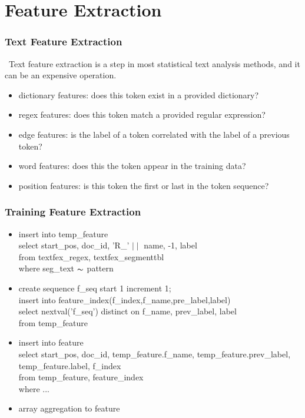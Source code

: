 \documentclass{beamer}
\begin{document}
\section{Feature Extraction}
\begin{frame}
  \frametitle{Text Feature Extraction}
   \ Text feature extraction is a step in most statistical text analysis methods, and it can be an expensive operation. 
     \begin{itemize}
      \item dictionary features: does this token exist in a provided dictionary? 
      \item regex features: does this token match a provided regular expression? 
      \item edge features: is the label of a token correlated with the label of a previous token? 
      \item word features: does this the token appear in the training data? 
      \item position features: is this token the first or last in the token sequence? 
     \end{itemize}
\end{frame}

\begin{frame}
  \frametitle{Training Feature Extraction}
  \begin{itemize}
  \item insert into temp\_feature\\ 
        select start\_pos, doc\_id, 'R\_' $\mid\mid$ name, -1, label\\
        from   textfex\_regex, textfex\_segmenttbl\\
        where  seg\_text $\thicksim$ pattern\\
  \item create sequence f\_seq start 1 increment 1;\\
        insert into feature\_index(f\_index,f\_name,pre\_label,label)\\ 
        select nextval('f\_seq') distinct on f\_name, prev\_label, label\\
        from   temp\_feature\\
  \item insert into feature\\
        select start\_pos, doc\_id, temp\_feature.f\_name, temp\_feature.prev\_label, temp\_feature.label, f\_index\\
        from   temp\_feature, feature\_index\\
        where ...\\
  \item array aggregation to feature
  \end{itemize}
\end{frame}
\end{document}
